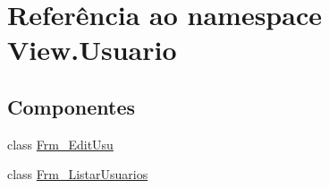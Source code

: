\hypertarget{namespace_view_1_1_usuario}{}\section{Referência ao namespace View.\+Usuario}
\label{namespace_view_1_1_usuario}
\subsection*{Componentes}
\begin{DoxyCompactItemize}
\item 
class \hyperlink{class_view_1_1_usuario_1_1_frm___edit_usu}{Frm\+\_\+\+Edit\+Usu}
\item 
class \hyperlink{class_view_1_1_usuario_1_1_frm___listar_usuarios}{Frm\+\_\+\+Listar\+Usuarios}
\end{DoxyCompactItemize}
